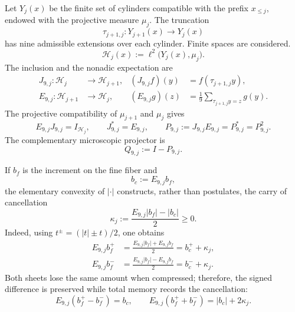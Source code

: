 Let \(Y_j(x)\) be the finite set of cylinders compatible with the prefix
\(x_{\leq j}\), endowed with the projective measure \(\mu_j\).  The truncation
\[
 \tau_{j+1,j}:Y_{j+1}(x)\longrightarrow Y_j(x)
\]
has nine admissible extensions over each cylinder. Finite spaces are considered.
\[
 \mathscr H_j(x):=\ell^2\bigl(Y_j(x),\mu_j\bigr).
\]
The inclusion and the nonadic expectation are
\begin{align}
 J_{9,j}:\mathscr H_j&\longrightarrow\mathscr H_{j+1},
 &(J_{9,j}f)(y)&=f(\tau_{j+1,j}y),
 \label{eq:pdfv2-sol-j9}\\
 E_{9,j}:\mathscr H_{j+1}&\longrightarrow\mathscr H_j,
 &(E_{9,j}g)(z)&=\frac1{9}
   \sum_{\tau_{j+1,j}y=z}g(y).
 \label{eq:pdfv2-sol-e9}
\end{align}
The projective compatibility of \(\mu_{j+1}\) and \(\mu_j\) gives
\begin{equation}\label{eq:pdfv2-sol-ej-projector}
 E_{9,j}J_{9,j}=I_{\mathscr H_j},
 \qquad
 J_{9,j}^*=E_{9,j},
 \qquad
 P_{9,j}:=J_{9,j}E_{9,j}=P_{9,j}^*=P_{9,j}^2.
\end{equation}
The complementary microscopic projector is
\begin{equation}\label{eq:pdfv2-sol-qmicro-preliminar}
 Q_{9,j}:=I-P_{9,j}.
\end{equation}

If \(b_f\) is the increment on the fine fiber and
\begin{equation}\label{eq:pdfv2-sol-bcoarse}
 b_c:=E_{9,j}b_f,
\end{equation}
the elementary convexity of \(|\cdot|\) constructs, rather than postulates, the carry of
cancellation
\begin{equation}\label{eq:pdfv2-sol-kappa}
 \kappa_j
 :=\frac{E_{9,j}|b_f|-|b_c|}{2}\geq0.
\end{equation}
Indeed, using \(t^\pm=(|t|\pm t)/2\), one obtains
\begin{align}
 E_{9,j}b_f^+
 &=\frac{E_{9,j}|b_f|+E_{9,j}b_f}{2}
   =b_c^++\kappa_j,
 \label{eq:pdfv2-sol-jensen-plus}\\
 E_{9,j}b_f^-
 &=\frac{E_{9,j}|b_f|-E_{9,j}b_f}{2}
   =b_c^-+\kappa_j.
 \label{eq:pdfv2-sol-jensen-minus}
\end{align}
Both sheets lose the same amount when compressed; therefore, the signed
difference is preserved while total memory records the cancellation:
\begin{equation}\label{eq:pdfv2-sol-jensen-dh}
 E_{9,j}(b_f^+-b_f^-)=b_c,
 \qquad
 E_{9,j}(b_f^++b_f^-)=|b_c|+2\kappa_j.
\end{equation}

